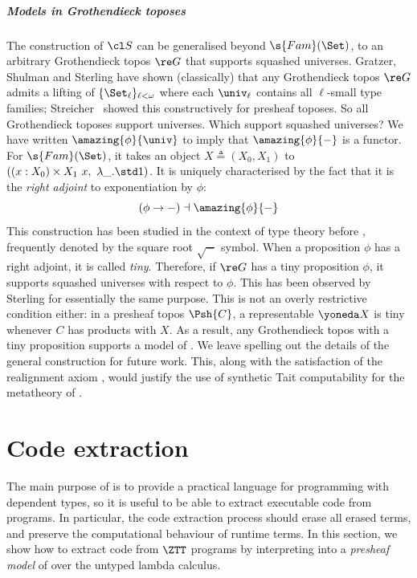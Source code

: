 \documentclass[a4paper,UKenglish,cleveref,autoref,thm-restate]{lipics-v2021}
\begin{document}
\subparagraph{Models in Grothendieck toposes} \label{ssub:mod-gro}

The construction of $\cl S$ can be generalised beyond
$\s{Fam}(\Set)$, to an arbitrary Grothendieck topos $\re G$ that supports
squashed universes. Gratzer, Shulman and Sterling \cite{Gratzer2022-gn} have
shown (classically) that any Grothendieck topos $\re G$ admits a lifting of
$\{\Set_\ell\}_{\ell < \omega}$ where each $\univ_\ell$ contains all
$\ell$-small type families; Streicher~\cite{Streicher2005-tm} showed this
constructively for presheaf toposes. So all Grothendieck toposes support
universes. Which support squashed universes? We have written
$\amazing{\phi}{\univ}$ to imply that $\amazing{\phi}{-}$ is a functor. For
$\s{Fam}(\Set)$, it takes an object $X \triangleq (X_0, X_1)$ to $((x : X_0)
\times X_1\ x,\ \lambda\_.\std 1)$. It is uniquely characterised by the fact
that it is the \emph{right adjoint} to exponentiation by $\phi$:
$$
(\phi \to -) \dashv \amazing{\phi}{-}
$$
This construction has been studied in the context of type theory before
\cite{Licata2018-fe,Nuyts2020-pu,Sterling2021-kp,Riley2024-zk}, frequently
denoted by the square root $\sqrt{-}$ symbol. When a proposition $\phi$ has a
right adjoint, it is called \emph{tiny}. Therefore, if $\re G$ has a tiny
proposition $\phi$, it supports squashed universes with respect to $\phi$. This
has been observed by Sterling \cite{Sterling2023-jx} for essentially the same
purpose. This is not an overly restrictive condition either: in a presheaf topos
$\Psh{C}$, a representable $\yoneda X$ is tiny whenever $C$ has products
with $X$. As a result, any Grothendieck topos with a tiny proposition supports a
model of \ZTT. We leave spelling out the details of the general construction for
future work. This, along with the satisfaction of the realignment axiom
\cite{Gratzer2022-gn}, would justify the use of synthetic Tait computability
\cite{Sterling2022-ym} for the metatheory of \ZTT.


\section{Code extraction}\label{sub:code-extr}

The main purpose of \ZTT is to provide a practical language for programming with
dependent types, so it is useful to be able to extract executable code from \ZTT
programs. In particular, the code extraction process should erase all erased
terms, and preserve the computational behaviour of runtime terms. In this
section, we show how to extract code from $\ZTT$ programs by interpreting into a
\emph{presheaf model} of \ZTT over the untyped lambda calculus.
\end{document}
